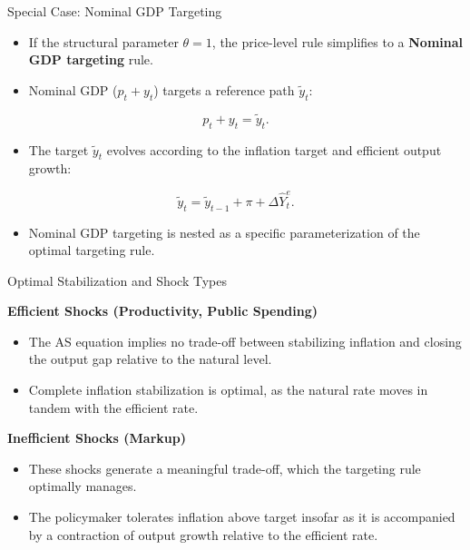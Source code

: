 \documentclass[11pt,aspectratio=169]{beamer}
\begin{document}
\begin{frame}{Special Case: Nominal GDP Targeting}
\small
\begin{itemize}
  \item If the structural parameter $\theta = 1$, the price-level rule simplifies to a \textbf{Nominal GDP targeting} rule.
  \item Nominal GDP ($p_{t}+y_{t}$) targets a reference path $\tilde{y}_{t}$:
\end{itemize}

\begin{equation*}
p_{t}+y_{t}=\tilde{y}_{t}.
\end{equation*}

\begin{itemize}
   \item The target $\tilde{y}_{t}$ evolves according to the inflation target and efficient output growth:
\end{itemize}

\begin{equation*}
\tilde{y}_{t}=\tilde{y}_{t-1}+\pi +\Delta \hat{Y}_{t}^{e}.
\end{equation*}



\vspace{0.2cm}

\begin{itemize}
  \item Nominal GDP targeting is nested as a specific parameterization of the optimal targeting rule.
  
\end{itemize}

\end{frame}

\begin{frame}{Optimal Stabilization and Shock Types}
\small

\textbf{Efficient Shocks (Productivity, Public Spending)}
\begin{itemize}
  \item The AS equation implies no trade-off between stabilizing inflation and closing the output gap relative to the natural level.
  \item Complete inflation stabilization is optimal, as the natural rate moves in tandem with the efficient rate.
\end{itemize}
\vspace{0.4cm}
\textbf{Inefficient Shocks (Markup)}
\begin{itemize}
  \item These shocks generate a meaningful trade-off, which the targeting rule optimally manages.
  \item The policymaker tolerates inflation above target insofar as it is accompanied by a contraction of output growth relative to the efficient rate.
\end{itemize}
\end{frame}
\end{document}
